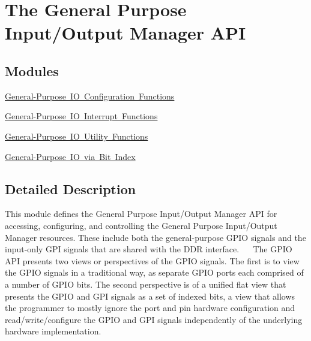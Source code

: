\hypertarget{group__ALT__GPIO__API}{}\section{The General Purpose Input/\+Output Manager A\+PI}
\label{group__ALT__GPIO__API}
\subsection*{Modules}
\begin{DoxyCompactItemize}
\item 
\mbox{\hyperlink{group__ALT__GPIO__API__CONFIG}{General-\/\+Purpose I\+O Configuration Functions}}
\item 
\mbox{\hyperlink{group__ALT__GPIO__INT}{General-\/\+Purpose I\+O Interrupt Functions}}
\item 
\mbox{\hyperlink{group__ALT__GPIO__UTILITY}{General-\/\+Purpose I\+O Utility Functions}}
\item 
\mbox{\hyperlink{group__ALT__GPIO__BITVIEW}{General-\/\+Purpose I\+O via Bit Index}}
\end{DoxyCompactItemize}


\subsection{Detailed Description}
This module defines the General Purpose Input/\+Output Manager A\+PI for accessing, configuring, and controlling the General Purpose Input/\+Output Manager resources. These include both the general-\/purpose G\+P\+IO signals and the input-\/only G\+PI signals that are shared with the D\+DR interface.~\newline
 ~\newline
The G\+P\+IO A\+PI presents two views or perspectives of the G\+P\+IO signals. The first is to view the G\+P\+IO signals in a traditional way, as separate G\+P\+IO ports each comprised of a number of G\+P\+IO bits. The second perspective is of a unified flat view that presents the G\+P\+IO and G\+PI signals as a set of indexed bits, a view that allows the programmer to mostly ignore the port and pin hardware configuration and read/write/configure the G\+P\+IO and G\+PI signals independently of the underlying hardware implementation. 